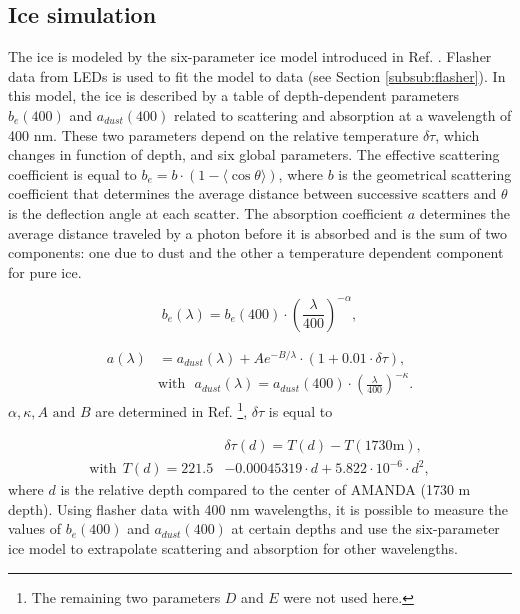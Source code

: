 \subsection{Ice simulation}
\label{subsec:icesimulation}
The ice is modeled by the six-parameter ice model introduced in Ref. \cite{Ackermann:2006pva}. Flasher data from LEDs is used to fit the model to data (see Section  \ref{subsub:flasher}). In this model, the ice is described by a table of depth-dependent parameters $b_e(400)$ and $a_{dust}(400)$ related to scattering and absorption at a wavelength of 400 nm. These two parameters depend on the relative temperature $\delta \tau$, which changes in function of depth, and six global parameters. The effective scattering coefficient is equal to $b_e = b \cdot \left( 1-\langle \cos \theta \rangle \right)$, where $b$ is the geometrical scattering coefficient that determines the average distance between successive scatters and $\theta$ is the deflection angle at each scatter. The absorption coefficient $a$ determines the average distance traveled by a photon before it is absorbed and is the sum of two components: one due to dust and the other a temperature dependent component for pure ice.

\begin{equation}
b_e(\lambda)  = b_e(400) \cdot \left( \frac{\lambda}{400}\right)^{-\alpha},
\end{equation}

\begin{equation}
\begin{split}
a(\lambda) &= a_{dust}(\lambda) + A e^{-B/\lambda} \cdot (1+0.01 \cdot \delta \tau), \\
&\textrm{with} \ \ \ a_{dust}(\lambda) = a_{dust}(400) \cdot \left( \frac{\lambda}{400}\right)^{-\kappa}.
\end{split}
\end{equation}
$\alpha, \kappa, A \textrm{ and } B$ are determined in Ref. \cite{Ackermann:2006pva}\footnote{The remaining two parameters $D$ and $E$ were not used here.}, $\delta \tau$ is equal to

\begin{equation}
\begin{split}
&\delta \tau(d) = T(d) - T(1730 \textrm{m}), \\ 
\textrm{with} \ \ T(d) = 221.5 &- 0.00045319 \cdot d + 5.822 \cdot 10^{-6} \cdot d^2,
\end{split}
\end{equation}
where $d$ is the relative depth compared to the center of AMANDA (1730 m depth). Using flasher data with 400 nm wavelengths, it is possible to measure the values of $b_e(400)$ and $a_{dust}(400)$ at certain depths and use the six-parameter ice model to extrapolate scattering and absorption for other wavelengths. 


